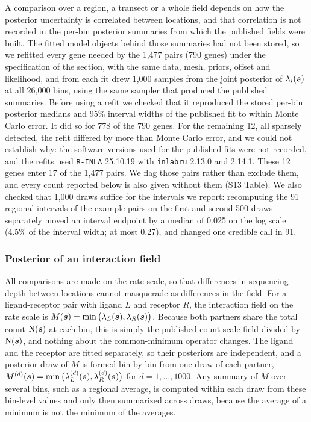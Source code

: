 \documentclass[10pt,letterpaper]{article}
\begin{document}
A comparison over a region, a transect or a whole field depends on how the posterior uncertainty is correlated between locations, and that correlation is not recorded in the per-bin posterior summaries from which the published fields were built. The fitted model objects behind those summaries had not been stored, so we refitted every gene needed by the 1,477 pairs (790 genes) under the specification of the  section, with the same data, mesh, priors, offset and likelihood, and from each fit drew 1,000 samples from the joint posterior of $\lambda_i(\mbox{\boldmath $s$})$ at all 26,000 bins, using the same sampler that produced the published summaries. Before using a refit we checked that it reproduced the stored per-bin posterior medians and 95\% interval widths of the published fit to within Monte Carlo error. It did so for 778 of the 790 genes. For the remaining 12, all sparsely detected, the refit differed by more than Monte Carlo error, and we could not establish why: the software versions used for the published fits were not recorded, and the refits used \texttt{R-INLA} 25.10.19 with \texttt{inlabru} 2.13.0 and 2.14.1. These 12 genes enter 17 of the 1,477 pairs. We flag those pairs rather than exclude them, and every count reported below is also given without them (S13 Table). We also checked that 1,000 draws suffice for the intervals we report: recomputing the 91 regional intervals of the example pairs on the first and second 500 draws separately moved an interval endpoint by a median of 0.025 on the log scale (4.5\% of the interval width; at most 0.27), and changed one credible call in 91.

\subsubsection*{Posterior of an interaction field}

All comparisons are made on the rate scale, so that differences in sequencing depth between locations cannot masquerade as differences in the field. For a ligand-receptor pair with ligand $L$ and receptor $R$, the interaction field on the rate scale is $M(\mbox{\boldmath $s$}) = \min\big(\lambda_L(\mbox{\boldmath $s$}), \lambda_R(\mbox{\boldmath $s$})\big)$. Because both partners share the total count $\mbox{N}(\mbox{\boldmath $s$})$ at each bin, this is simply the published count-scale field divided by $\mbox{N}(\mbox{\boldmath $s$})$, and nothing about the common-minimum operator changes. The ligand and the receptor are fitted separately, so their posteriors are independent, and a posterior draw of $M$ is formed bin by bin from one draw of each partner, $M^{(d)}(\mbox{\boldmath $s$}) = \min\big(\lambda_L^{(d)}(\mbox{\boldmath $s$}), \lambda_R^{(d)}(\mbox{\boldmath $s$})\big)$ for $d = 1,\dots,1000$. Any summary of $M$ over several bins, such as a regional average, is computed within each draw from these bin-level values and only then summarized across draws, because the average of a minimum is not the minimum of the averages.
\end{document}
